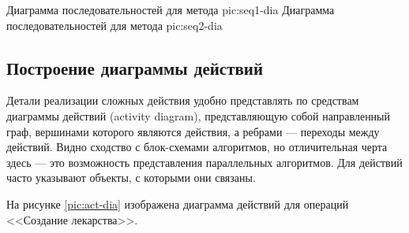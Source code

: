 {Диаграмма последовательностей для метода
}{pic:seq1-dia}
{Диаграмма последовательностей для метода
}{pic:seq2-dia}



\subsection{Построение диаграммы действий}


Детали реализации сложных действия удобно представлять по средствам диаграммы
действий (activity diagram), представляющую собой направленный граф, вершинами
которого являются действия, а ребрами --- переходы между действий. Видно
сходство с блок-схемами алгоритмов, но отличительная черта здесь --- это
возможность представления параллельных алгоритмов. Для действий часто указывают
объекты, с которыми они связаны.

На рисунке \ref{pic:act-dia} изображена диаграмма действий для операций
<<Создание лекарства>>.



\clearpage

